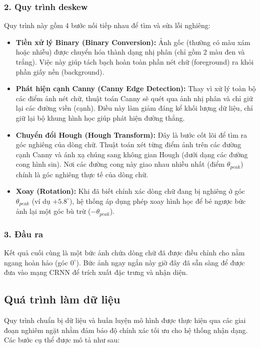 \subsubsection*{2. Quy trình deskew}
Quy trình này gồm 4 bước nối tiếp nhau để tìm và sửa lỗi nghiêng:
    \begin{itemize}
        \item \textbf{Tiền xử lý Binary (Binary Conversion):} Ảnh gốc (thường có màu xám hoặc nhiễu) được chuyển hóa thành dạng nhị phân (chỉ gồm 2 màu đen và trắng). Việc này giúp tách bạch hoàn toàn phần nét chữ (foreground) ra khỏi phần giấy nền (background).
        \item \textbf{Phát hiện cạnh Canny (Canny Edge Detection):} Thay vì xử lý toàn bộ các điểm ảnh nét chữ, thuật toán Canny sẽ quét qua ảnh nhị phân và chỉ giữ lại các đường viền (cạnh). Điều này làm giảm đáng kể khối lượng dữ liệu, chỉ giữ lại bộ khung hình học giúp phát hiện đường thẳng.
        \item \textbf{Chuyển đổi Hough (Hough Transform):} Đây là bước cốt lõi để tìm ra góc nghiêng của dòng chữ. Thuật toán xét từng điểm ảnh trên các đường cạnh Canny và ánh xạ chúng sang không gian Hough (dưới dạng các đường cong hình sin). Nơi các đường cong này giao nhau nhiều nhất (điểm $\theta_{peak}$) chính là góc nghiêng thực tế của dòng chữ.
        \item \textbf{Xoay (Rotation):} Khi đã biết chính xác dòng chữ đang bị nghiêng ở góc $\theta_{peak}$ (ví dụ $+5.8^\circ$), hệ thống áp dụng phép xoay hình học để bẻ ngược bức ảnh lại một góc bù trừ ($-\theta_{peak}$).
    \end{itemize}

\subsubsection*{3. Đầu ra}

Kết quả cuối cùng là một bức ảnh chứa dòng chữ đã được điều chỉnh cho nằm ngang hoàn hảo (góc $0^\circ$). Bức ảnh ngay ngắn này giờ đây đã sẵn sàng để được đưa vào mạng CRNN để trích xuất đặc trưng và nhận diện.

\subsection{Quá trình làm dữ liệu}

Quy trình chuẩn bị dữ liệu và huấn luyện mô hình được thực hiện qua các giai đoạn nghiêm ngặt nhằm đảm bảo độ chính xác tối ưu cho hệ thống nhận dạng. Các bước cụ thể được mô tả như sau:

